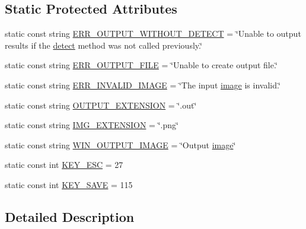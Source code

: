 \subsection*{Static Protected Attributes}
\begin{DoxyCompactItemize}
\item 
static const string \hyperlink{classmultiscale_1_1analysis_1_1Detector_a5837f0e4ffef6410774ff9bcda72238b}{E\-R\-R\-\_\-\-O\-U\-T\-P\-U\-T\-\_\-\-W\-I\-T\-H\-O\-U\-T\-\_\-\-D\-E\-T\-E\-C\-T} = \char`\"{}Unable to output results if the \hyperlink{classmultiscale_1_1analysis_1_1Detector_acfb9aaec94382e4a7bee6d9874d4bcef}{detect} method was not called previously.\char`\"{}
\item 
static const string \hyperlink{classmultiscale_1_1analysis_1_1Detector_aab6b3a68e93cad9a93885e52f1c2ce04}{E\-R\-R\-\_\-\-O\-U\-T\-P\-U\-T\-\_\-\-F\-I\-L\-E} = \char`\"{}Unable to create output file.\char`\"{}
\item 
static const string \hyperlink{classmultiscale_1_1analysis_1_1Detector_aa5dc8982745f567379e0eccd416c6820}{E\-R\-R\-\_\-\-I\-N\-V\-A\-L\-I\-D\-\_\-\-I\-M\-A\-G\-E} = \char`\"{}The input \hyperlink{classmultiscale_1_1analysis_1_1Detector_a523830a6cfe409694ce8327c3c736fbd}{image} is invalid.\char`\"{}
\item 
static const string \hyperlink{classmultiscale_1_1analysis_1_1Detector_a3030def7fe61741fcc8f5c8b50f40e57}{O\-U\-T\-P\-U\-T\-\_\-\-E\-X\-T\-E\-N\-S\-I\-O\-N} = \char`\"{}.out\char`\"{}
\item 
static const string \hyperlink{classmultiscale_1_1analysis_1_1Detector_acc73b4fb215305ffd7f3d6df8807cc5e}{I\-M\-G\-\_\-\-E\-X\-T\-E\-N\-S\-I\-O\-N} = \char`\"{}.png\char`\"{}
\item 
static const string \hyperlink{classmultiscale_1_1analysis_1_1Detector_a883b5de8d273a2bfab31e45bc285c78d}{W\-I\-N\-\_\-\-O\-U\-T\-P\-U\-T\-\_\-\-I\-M\-A\-G\-E} = \char`\"{}Output \hyperlink{classmultiscale_1_1analysis_1_1Detector_a523830a6cfe409694ce8327c3c736fbd}{image}\char`\"{}
\item 
static const int \hyperlink{classmultiscale_1_1analysis_1_1Detector_a0d1f2fd9eae1b166ac097668889c02aa}{K\-E\-Y\-\_\-\-E\-S\-C} = 27
\item 
static const int \hyperlink{classmultiscale_1_1analysis_1_1Detector_aa9acc60392e3eb0f0a9c3019c63301ae}{K\-E\-Y\-\_\-\-S\-A\-V\-E} = 115
\end{DoxyCompactItemize}


\subsection{Detailed Description}


